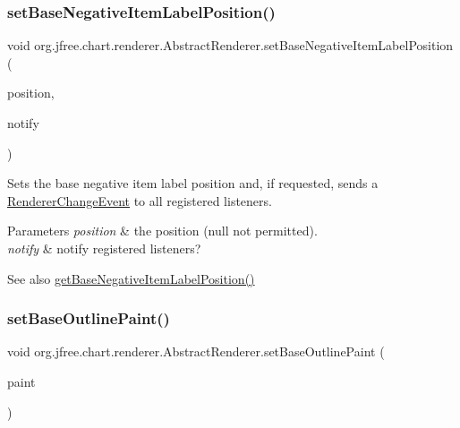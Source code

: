 \subsubsection{\texorpdfstring{set\+Base\+Negative\+Item\+Label\+Position()}{setBaseNegativeItemLabelPosition()}\hspace{0.1cm}{\footnotesize\ttfamily [2/2]}}
{\footnotesize\ttfamily void org.\+jfree.\+chart.\+renderer.\+Abstract\+Renderer.\+set\+Base\+Negative\+Item\+Label\+Position (\begin{DoxyParamCaption}\item[{\mbox{\hyperlink{classorg_1_1jfree_1_1chart_1_1labels_1_1_item_label_position}{Item\+Label\+Position}}}]{position,  }\item[{boolean}]{notify }\end{DoxyParamCaption})}

Sets the base negative item label position and, if requested, sends a \mbox{\hyperlink{}{Renderer\+Change\+Event}} to all registered listeners.


\begin{DoxyParams}{Parameters}
{\em position} & the position ({\ttfamily null} not permitted). \\
\hline
{\em notify} & notify registered listeners?\\
\hline
\end{DoxyParams}
\begin{DoxySeeAlso}{See also}
\mbox{\hyperlink{classorg_1_1jfree_1_1chart_1_1renderer_1_1_abstract_renderer_aa258bdeed3dd89d9de396d3c4e65d541}{get\+Base\+Negative\+Item\+Label\+Position()}} 
\end{DoxySeeAlso}
\mbox{\label{classorg_1_1jfree_1_1chart_1_1renderer_1_1_abstract_renderer_ab1a850a60c44c51d4cbaa83c294b2f86}} 
\subsubsection{\texorpdfstring{set\+Base\+Outline\+Paint()}{setBaseOutlinePaint()}\hspace{0.1cm}{\footnotesize\ttfamily [1/2]}}
{\footnotesize\ttfamily void org.\+jfree.\+chart.\+renderer.\+Abstract\+Renderer.\+set\+Base\+Outline\+Paint (\begin{DoxyParamCaption}\item[{Paint}]{paint }\end{DoxyParamCaption})}

